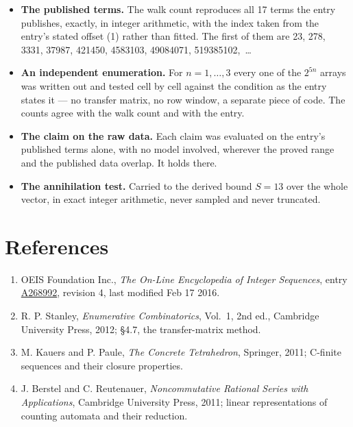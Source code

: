 \documentclass[11pt]{article}
\theoremstyle{definition}
\begin{document}
\begin{itemize}

\item {\bfseries The published terms.} The walk count reproduces all 17 terms the entry publishes, exactly, in integer arithmetic, with the index taken from the entry's stated offset (1) rather than fitted. The first of them are 23, 278, 3331, 37987, 421450, 4583103, 49084071, 519385102,~\dots

\item {\bfseries An independent enumeration.} For $n = 1,\dots,3$ every one of the $2^{5n}$ arrays was written out and tested cell by cell against the condition as the entry states it --- no transfer matrix, no row window, a separate piece of code. The counts agree with the walk count and with the entry.

\item {\bfseries The claim on the raw data.} Each claim was evaluated on the entry's published terms alone, with no model involved, wherever the proved range and the published data overlap. It holds there.

\item {\bfseries The annihilation test.} Carried to the derived bound $S = 13$ over the whole vector, in exact integer arithmetic, never sampled and never truncated.

\end{itemize}

\section{References}

\begin{enumerate}

\item OEIS Foundation Inc., \emph{The On-Line Encyclopedia of Integer Sequences}, entry \href{https://oeis.org/A268992}{A268992}, revision 4, last modified Feb 17 2016.

\item R. P. Stanley, \emph{Enumerative Combinatorics}, Vol.~1, 2nd ed., Cambridge University Press, 2012; \S4.7, the transfer-matrix method.

\item M. Kauers and P. Paule, \emph{The Concrete Tetrahedron}, Springer, 2011; C-finite sequences and their closure properties.

\item J. Berstel and C. Reutenauer, \emph{Noncommutative Rational Series with Applications}, Cambridge University Press, 2011; linear representations of counting automata and their reduction.

\end{enumerate}
\end{document}
